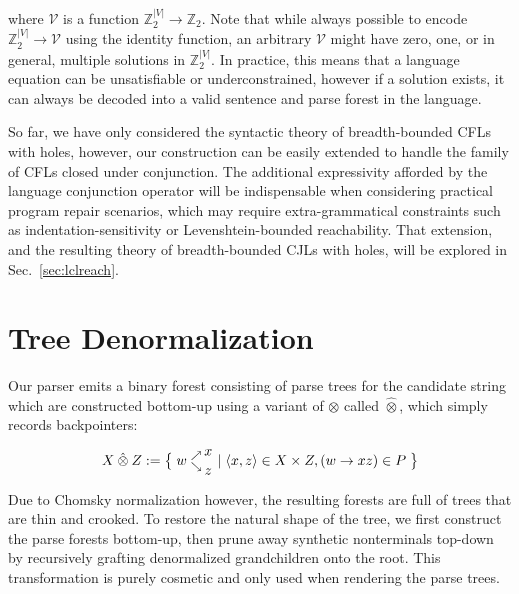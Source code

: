 \documentclass[sigplan,review,anonymous,acmsmall]{acmart}\settopmatter{printfolios=false,printccs=false,printacmref=false}
\begin{document}
\noindent where $\mathcal{V}$ is a function $\mathbb{Z}_2^{|V|}\rightarrow\mathbb{Z}_2$. Note that while always possible to encode $\mathbb{Z}_2^{|V|} \rightarrow \mathcal{V}$ using the identity function, an arbitrary $\mathcal{V}$ might have zero, one, or in general, multiple solutions in $\mathbb{Z}_2^{|V|}$. In practice, this means that a language equation can be unsatisfiable or underconstrained, however if a solution exists, it can always be decoded into a valid sentence and parse forest in the language.

So far, we have only considered the syntactic theory of breadth-bounded CFLs with holes, however, our construction can be easily extended to handle the family of CFLs closed under conjunction. The additional expressivity afforded by the language conjunction operator will be indispensable when considering practical program repair scenarios, which may require extra-grammatical constraints such as indentation-sensitivity or Levenshtein-bounded reachability. That extension, and the resulting theory of breadth-bounded CJLs with holes, will be explored in Sec.~\ref{sec:lclreach}.

\section{Tree Denormalization}


Our parser emits a binary forest consisting of parse trees for the candidate string which are constructed bottom-up using a variant of $\otimes$ called $\hat{\otimes}$, which simply records backpointers:

\begin{align}
   X\:\hat{\otimes}\:Z := \big\{\;w\hphantom{.}^{\nearrow}_{\searrow}\nobarfrac{x}{z} \mid \langle x, z\rangle \in X \times Z, (w\rightarrow xz) \in P\;\big\}
\end{align}

Due to Chomsky normalization however, the resulting forests are full of trees that are thin and crooked. To restore the natural shape of the tree, we first construct the parse forests bottom-up, then prune away synthetic nonterminals top-down by recursively grafting denormalized grandchildren onto the root. This transformation is purely cosmetic and only used when rendering the parse trees.
\end{document}
